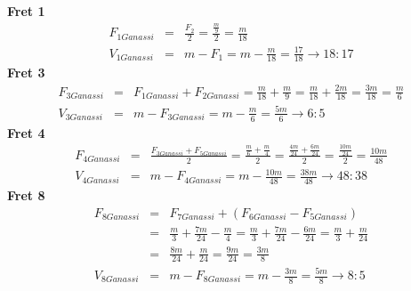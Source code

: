 \textbf{Fret 1}
\begin{eqnarray*}
    F_{1Ganassi}
        &=& \frac{F_2}{2}
        = \frac{\frac{m}{9}}{2}
        = \frac{m}{18} \\
    V_{1Ganassi}
        &=& m - F_1
        = m - \frac{m}{18}
        = \frac{17}{18}
        \to 18:17
\end{eqnarray*}
\textbf{Fret 3}
\begin{eqnarray*}
    F_{3Ganassi}
        &=& F_{1Ganassi} + F_{2Ganassi}
        = \frac{m}{18} + \frac{m}{9}
        = \frac{m}{18} + \frac{2m}{18}
        = \frac{3m}{18}
        = \frac{m}{6} \\
    V_{3Ganassi}
        &=& m - F_{3Ganassi}
        = m - \frac{m}{6}
        = \frac{5m}{6}
        \to 6:5
\end{eqnarray*}
\textbf{Fret 4}
\begin{eqnarray*}
    F_{4Ganassi}
        &=& \frac{F_{3Ganassi} + F_{5Ganassi}}{2}
        = \frac{\frac{m}{6} + \frac{m}{4}}{2}
        = \frac{\frac{4m}{24} + \frac{6m}{24}}{2}
        = \frac{\frac{10m}{24}}{2}
        = \frac{10m}{48} \\
    V_{4Ganassi}
        &=& m - F_{4Ganassi}
        = m - \frac{10m}{48}
        = \frac{38m}{48}
        \to 48:38
\end{eqnarray*}
\textbf{Fret 8}
\begin{eqnarray*}
    F_{8Ganassi}
        &=& F_{7Ganassi} + (F_{6Ganassi} - F_{5Ganassi}) \\
        &=& \frac{m}{3} + \frac{7m}{24} - \frac{m}{4}
        = \frac{m}{3} + \frac{7m}{24} - \frac{6m}{24}
        = \frac{m}{3} + \frac{m}{24} \\
        &=& \frac{8m}{24} + \frac{m}{24}
        = \frac{9m}{24}
        = \frac{3m}{8} \\
    V_{8Ganassi}
        &=& m - F_{8Ganassi}
        = m - \frac{3m}{8}
        = \frac{5m}{8}
        \to 8:5
\end{eqnarray*}